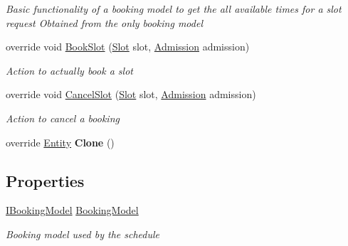 \begin{DoxyCompactItemize}
\begin{DoxyCompactList}\small\item\em Basic functionality of a booking model to get the all available times for a slot request Obtained from the only booking model \end{DoxyCompactList}\item 
override void \hyperlink{class_general_health_care_elements_1_1_booking_models_1_1_entity_single_booking_model_waiting_list_a2a894a39f39bf67d28f91a0b3dbc9913}{Book\+Slot} (\hyperlink{class_general_health_care_elements_1_1_booking_models_1_1_slot}{Slot} slot, \hyperlink{class_general_health_care_elements_1_1_treatment_admission_types_1_1_admission}{Admission} admission)
\begin{DoxyCompactList}\small\item\em Action to actually book a slot \end{DoxyCompactList}\item 
override void \hyperlink{class_general_health_care_elements_1_1_booking_models_1_1_entity_single_booking_model_waiting_list_a134f793696408eada4dcfa35b02649c8}{Cancel\+Slot} (\hyperlink{class_general_health_care_elements_1_1_booking_models_1_1_slot}{Slot} slot, \hyperlink{class_general_health_care_elements_1_1_treatment_admission_types_1_1_admission}{Admission} admission)
\begin{DoxyCompactList}\small\item\em Action to cancel a booking \end{DoxyCompactList}\item 
override \hyperlink{class_simulation_core_1_1_h_c_c_m_elements_1_1_entity}{Entity} {\bfseries Clone} ()\hypertarget{class_general_health_care_elements_1_1_booking_models_1_1_entity_single_booking_model_waiting_list_a28e570687299c48e6a59f46d930eb939}{}\label{class_general_health_care_elements_1_1_booking_models_1_1_entity_single_booking_model_waiting_list_a28e570687299c48e6a59f46d930eb939}

\end{DoxyCompactItemize}
\subsection*{Properties}
\begin{DoxyCompactItemize}
\item 
\hyperlink{interface_general_health_care_elements_1_1_booking_models_1_1_i_booking_model}{I\+Booking\+Model} \hyperlink{class_general_health_care_elements_1_1_booking_models_1_1_entity_single_booking_model_waiting_list_a30e90e30df99537cdc7cf0f4cd9f7472}{Booking\+Model}
\begin{DoxyCompactList}\small\item\em Booking model used by the schedule \end{DoxyCompactList}\end{DoxyCompactItemize}
